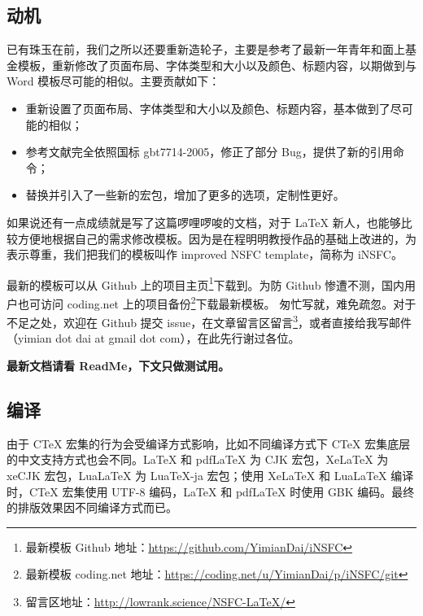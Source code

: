 \documentclass[a4paper,zihao=-4]{article}
\begin{document}
\begin{CJK*}{UTF8}{gbsn}
\subsection{动机}
已有珠玉在前，我们之所以还要重新造轮子，主要是参考了最新一年青年和面上基金模板，重新修改了页面布局、字体类型和大小以及颜色、标题内容，以期做到与 Word 模板尽可能的相似。主要贡献如下：
\begin{itemize}
	\item 重新设置了页面布局、字体类型和大小以及颜色、标题内容，基本做到了尽可能的相似；
	\item 参考文献完全依照国标 gbt7714-2005，修正了部分 Bug，提供了新的引用命令；
	\item 替换并引入了一些新的宏包，增加了更多的选项，定制性更好。
\end{itemize}
如果说还有一点成绩就是写了这篇啰哩啰唆的文档，对于 LaTeX 新人，也能够比较方便地根据自己的需求修改模板。因为是在程明明教授作品的基础上改进的，为表示尊重，我们把我们的模板叫作 improved NSFC template，简称为 iNSFC。

最新的模板可以从 Github 上的项目主页\footnote{最新模板 Github 地址：\href{https://github.com/YimianDai/iNSFC}{https://github.com/YimianDai/iNSFC}}下载到。为防 Github 惨遭不测，国内用户也可访问 coding.net 上的项目备份\footnote{最新模板 coding.net 地址：\href{https://coding.net/u/YimianDai/p/iNSFC/git}{https://coding.net/u/YimianDai/p/iNSFC/git}}下载最新模板。
匆忙写就，难免疏忽。对于不足之处，欢迎在 Github 提交 issue，在文章留言区留言\footnote{留言区地址：\href{http://lowrank.science/NSFC-LaTeX/}{http://lowrank.science/NSFC-LaTeX/}}，或者直接给我写邮件（yimian dot dai at gmail dot com），在此先行谢过各位。



\textbf{最新文档请看 ReadMe，下文只做测试用。}

\subsection{编译}
由于 CTeX 宏集的行为会受编译方式影响，比如不同编译方式下 CTeX 宏集底层的中文支持方式也会不同。LaTeX 和 pdfLaTeX 为 CJK 宏包，XeLaTeX 为 xeCJK 宏包，LuaLaTeX 为 LuaTeX-ja 宏包；使用 XeLaTeX 和 LuaLaTeX 编译时，CTeX 宏集使用 UTF-8 编码，LaTeX 和 pdfLaTeX 时使用 GBK 编码。最终的排版效果因不同编译方式而已。


\end{CJK*}
\end{document}
